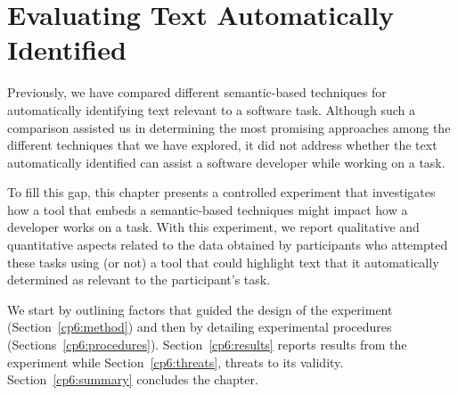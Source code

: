 \setcounter{chapter}{5}
\setcounter{rq}{1}


\chapter{Evaluating Text Automatically Identified}
\label{ch:assisting}




Previously, we have compared different semantic-based techniques for automatically identifying text relevant to a software task.
Although such a comparison assisted us in determining the most promising approaches among the different techniques that we have explored, it did not address whether 
the text automatically identified  
can assist a software developer while working on a task.



To fill this gap, this chapter presents a controlled experiment that 
investigates how a tool that embeds a semantic-based techniques 
might impact how a developer works on a task. 
With this experiment, we report qualitative and quantitative aspects related to the data obtained by participants who attempted these tasks using
(or not) a tool that could highlight text that it automatically determined as relevant to the participant's task. 





We start by outlining factors that guided the design of the experiment (Section~\ref{cp6:method}) and then 
by detailing experimental procedures (Sections~\ref{cp6:procedures}).
Section~\ref{cp6:results} reports results from the experiment while 
Section~\ref{cp6:threats}, threats to its validity.
Section~\ref{cp6:summary} concludes the chapter.


\clearpage






















% 

